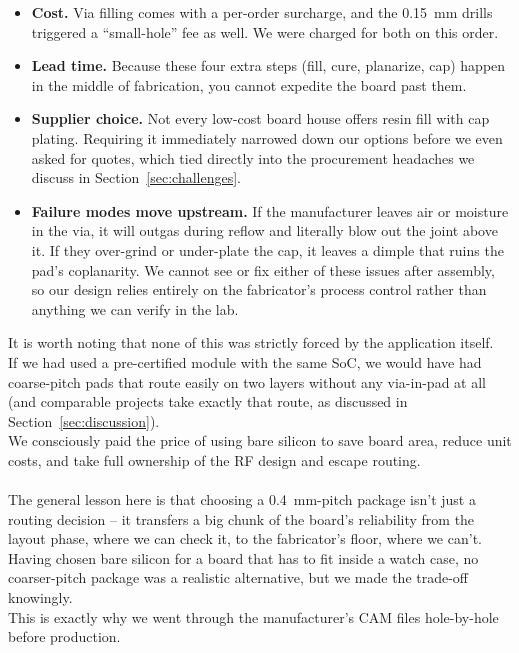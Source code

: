 \documentclass[12pt, a4paper]{article}
\begin{document}
\begin{itemize}
  \item \textbf{Cost.} Via filling comes with a per-order surcharge, and the \SI{0.15}{\milli\metre} drills triggered a ``small-hole'' fee as well. We were charged for both on this order.
  \item \textbf{Lead time.} Because these four extra steps (fill, cure, planarize, cap) happen in the middle of fabrication, you cannot expedite the board past them.
  \item \textbf{Supplier choice.} Not every low-cost board house offers resin fill with cap plating. Requiring it immediately narrowed down our options before we even asked for quotes, which tied directly into the procurement headaches we discuss in Section~\ref{sec:challenges}.
  \item \textbf{Failure modes move upstream.} If the manufacturer leaves air or moisture in the via, it will outgas during reflow and literally blow out the joint above it. If they over-grind or under-plate the cap, it leaves a dimple that ruins the pad's coplanarity. We cannot see or fix either of these issues after assembly, so our design relies entirely on the fabricator's process control rather than anything we can verify in the lab.
\end{itemize}
It is worth noting that none of this was strictly forced by the application itself. \\
If we had used a pre-certified module with the same SoC, we would have had coarse-pitch pads that route easily on two layers without any via-in-pad at all (and comparable projects take exactly that route, as discussed in Section~\ref{sec:discussion}). \\
We consciously paid the price of using bare silicon to save board area, reduce unit costs, and take full ownership of the RF design and escape routing.\\\\
The general lesson here is that choosing a \SI{0.4}{\milli\metre}-pitch package isn't just a routing decision -- it transfers a big chunk of the board's reliability from the layout phase, where we can check it, to the fabricator's floor, where we can't. \\
Having chosen bare silicon for a board that has to fit inside a watch case, no coarser-pitch package was a realistic alternative, but we made the trade-off knowingly. \\
This is exactly why we went through the manufacturer's CAM files hole-by-hole before production.\\\\
\end{document}
